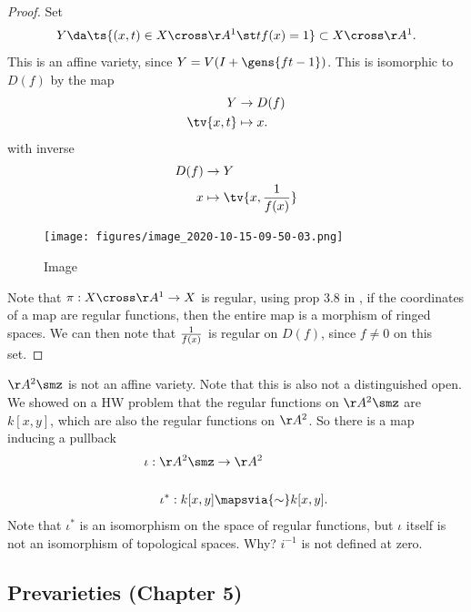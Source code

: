 \begin{proof}

Set
\begin{align*}  
Y \da \ts{(x, t) \in X\cross \AA^1 \st tf(x) = 1} \subset X\cross \AA^1
.\end{align*} This is an affine variety, since
\(Y = V(I + \gens{ft-1})\). This is isomorphic to \(D(f)\) by the map
\begin{align*}  
Y &\to D(f) \\
\tv{x, t} &\mapsto x
.\end{align*} with inverse
\begin{align*}
D(f)  &\to Y \\
x     &\mapsto \tv{x, {1\over f(x)} }
\end{align*}

\begin{figure}
\centering
\texttt{[image: figures/image\_2020-10-15-09-50-03.png]}
\caption{Image}
\end{figure}

Note that \(\pi: X\cross \AA^1 \to X\) is regular, using prop 3.8 in
\autocite{AndreasGathmann515}, if the coordinates of a map are regular
functions, then the entire map is a morphism of ringed spaces. We can
then note that \(1\over f(x)\) is regular on \(D(f)\), since \(f\neq 0\)
on this set.

\end{proof}

\begin{example}

\(\AA^2 \smz\) is not an affine variety. Note that this is also not a
distinguished open. We showed on a HW problem that the regular functions
on \(\AA^2\smz\) are \(k[x, y]\), which are also the regular functions
on \(\AA^2\). So there is a map inducing a pullback
\begin{align*}  
\iota: \AA^2\smz &\to \AA^2 \\ \\
\iota^*: k[x, y]  &\mapsvia{\sim} k[x, y]
.\end{align*} Note that \(\iota^*\) is an isomorphism on the space of
regular functions, but \(\iota\) itself is not an isomorphism of
topological spaces. Why? \(i^{-1}\) is not defined at zero.

\end{example}

\hypertarget{prevarieties-chapter-5}{%
\subsection{Prevarieties (Chapter 5)}\label{prevarieties-chapter-5}}

